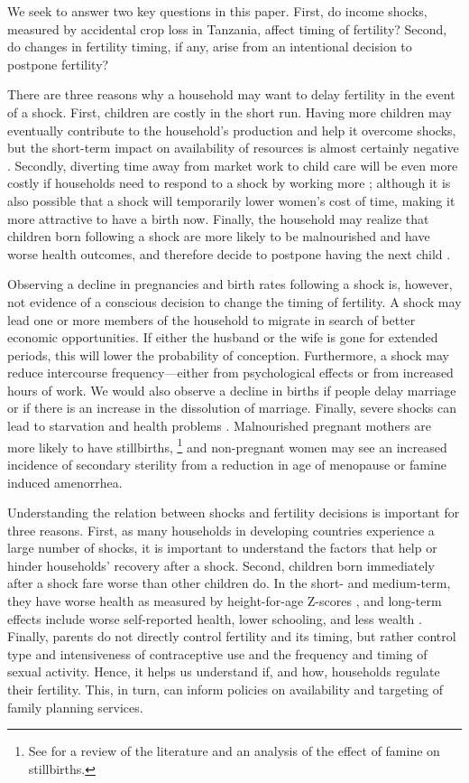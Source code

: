 \documentclass[letterpaper,12pt]{article}
\begin{document}
We seek to answer two key questions in this paper.
First, do income shocks, measured by accidental crop loss in Tanzania, affect timing of 
fertility?
Second, do changes in fertility timing, if any, arise from an intentional decision
to postpone fertility?

There are three reasons why a household may want to delay fertility in the
event of a shock.
First, children are costly in the short run.
Having more children may eventually contribute to the household's production 
and help it overcome shocks, but the short-term impact on availability 
of resources is almost certainly negative \citep{Portner2014}.
Secondly, diverting time away from market work to child care will be even more costly
if households need to respond to a shock by working more \citep{kochar99};
although it is also possible that a shock will temporarily lower women's cost 
of time, making it more attractive to have a birth now.
Finally, the household may realize that children born following a shock 
are more likely to be malnourished and have worse health outcomes, and therefore 
decide to postpone having the next child \citep{Portner2010}.

Observing a decline in pregnancies and birth rates following a shock is, however, 
not evidence of a conscious decision to change the timing of fertility.
A shock may lead one or more members of the household to migrate 
in search of better economic opportunities.
If either the husband or the wife is gone for extended periods, this 
will lower the probability of conception.
Furthermore, a shock may reduce intercourse frequency---either
from psychological effects or from increased hours of work.
We would also observe a decline in births if people delay marriage or if there
is an increase in the dissolution of marriage.
Finally, severe shocks can lead to starvation and health problems \citep{lindstrom99}.
Malnourished pregnant mothers are more likely to have stillbirths,%
\footnote{
See \cite{Hernandez-Julian2014} for a review of the literature and an 
analysis of the effect of famine on stillbirths.
}
and non-pregnant women may see an increased incidence of secondary sterility
from a reduction in age of menopause or famine induced amenorrhea. 

Understanding the relation between shocks and fertility decisions is important for
three reasons.
First, as many households in developing countries experience a large number of shocks, 
it is important to understand the factors that help or hinder households' recovery 
after a shock.
Second, children born immediately after a shock fare worse than other children do.
In the short- and medium-term, they have worse health as measured by height-for-age 
Z-scores \citep{Portner2010}, and
long-term effects include worse self-reported health, lower schooling, and less
wealth \citep{Maccini2009}.
Finally, parents do not directly control fertility and its timing, but rather 
control type and intensiveness of contraceptive use and the frequency and timing of 
sexual activity.
Hence, it helps us understand if, and how, households regulate their fertility.
This, in turn, can inform policies on availability and targeting
of family planning services.
\end{document}
